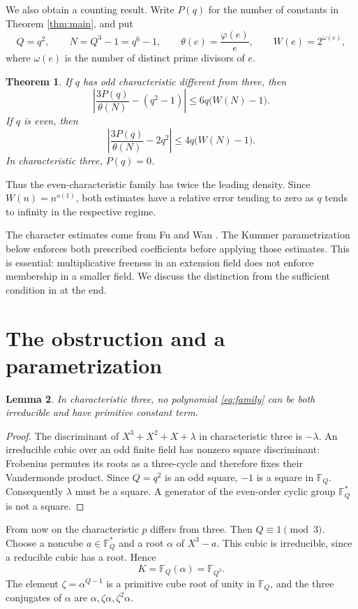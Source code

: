 \documentclass[11pt]{article}
\newtheorem{theorem}{Theorem}[section]
\newtheorem{lemma}[theorem]{Lemma}
\theoremstyle{remark}\newtheorem{remark}[theorem]{Remark}
\newcommand{\F}{\mathbb F}
\begin{document}
We also obtain a counting result. Write $P(q)$ for the number of constants in Theorem \ref{thm:main}, and put
\[
 Q=q^2,\qquad N=Q^3-1=q^6-1,\qquad
 \theta(e)=\frac{\varphi(e)}e,\qquad W(e)=2^{\omega(e)},
\]
where $\omega(e)$ is the number of distinct prime divisors of $e$.

\begin{theorem}\label{thm:count}
If $q$ has odd characteristic different from three, then
\[
 \left|\frac{3P(q)}{\theta(N)}-(q^2-1)\right|
 \le 6q\bigl(W(N)-1\bigr).
\]
If $q$ is even, then
\[
 \left|\frac{3P(q)}{\theta(N)}-2q^2\right|
 \le 4q\bigl(W(N)-1\bigr).
\]
In characteristic three, $P(q)=0$.
\end{theorem}

Thus the even-characteristic family has twice the leading density. Since $W(n)=n^{o(1)}$, both estimates have a relative error tending to zero as $q$ tends to infinity in the respective regime.

The character estimates come from Fu and Wan \cite[Proposition 2.1 and Theorem 4.2]{FW}. The Kummer parametrization below enforces both prescribed coefficients before applying those estimates. This is essential: multiplicative freeness in an extension field does not enforce membership in a smaller field. We discuss the distinction from the sufficient condition in \cite{S} at the end.

\section{The obstruction and a parametrization}

\begin{lemma}\label{lem:obstruction}
In characteristic three, no polynomial \eqref{eq:family} can be both irreducible and have primitive constant term.
\end{lemma}
\begin{proof}
The discriminant of $X^3+X^2+X+\lambda$ in characteristic three is $-\lambda$. An irreducible cubic over an odd finite field has nonzero square discriminant: Frobenius permutes its roots as a three-cycle and therefore fixes their Vandermonde product. Since $Q=q^2$ is an odd square, $-1$ is a square in $\F_Q$. Consequently $\lambda$ must be a square. A generator of the even-order cyclic group $\F_Q^*$ is not a square.
\end{proof}

From now on the characteristic $p$ differs from three. Then $Q\equiv1\pmod3$. Choose a noncube $a\in\F_Q^*$ and a root $\alpha$ of $X^3-a$. This cubic is irreducible, since a reducible cubic has a root. Hence
\[
 K=\F_Q(\alpha)=\F_{Q^3}.
\]
The element $\zeta=\alpha^{Q-1}$ is a primitive cube root of unity in $\F_Q$, and the three conjugates of $\alpha$ are $\alpha,\zeta\alpha,\zeta^2\alpha$.
\end{document}
